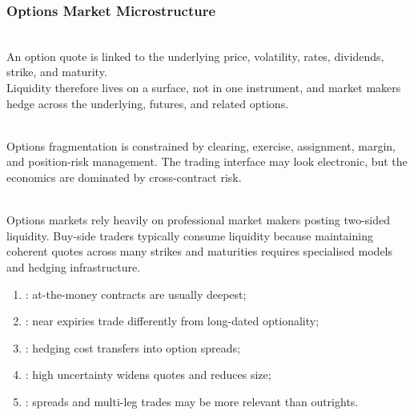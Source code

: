 \subsubsection{Options Market Microstructure}

\begin{principle} \\
An option quote is linked to the underlying price, volatility, rates, dividends, strike, and maturity.\\
Liquidity therefore lives on a surface, not in one instrument, and market makers hedge across the underlying, futures, and related options.
\end{principle}

\begin{caveat} \\
Options fragmentation is constrained by clearing, exercise, assignment, margin, and position-risk management. The trading interface may look electronic, but the economics are dominated by cross-contract risk.
\end{caveat}

\begin{mechanism} \\
Options markets rely heavily on professional market makers posting two-sided liquidity. Buy-side traders typically consume liquidity because maintaining coherent quotes across many strikes and maturities requires specialised models and hedging infrastructure.
\end{mechanism}

\begin{taxonomy} 
\begin{enumerate}[label=\roman*.]
\setlength{\itemsep}{0pt}
\item {}: at-the-money contracts are usually deepest;
\item {}: near expiries trade differently from long-dated optionality;
\item {}: hedging cost transfers into option spreads;
\item {}: high uncertainty widens quotes and reduces size;
\item {}: spreads and multi-leg trades may be more relevant than outrights.
\end{enumerate}
\end{taxonomy}
